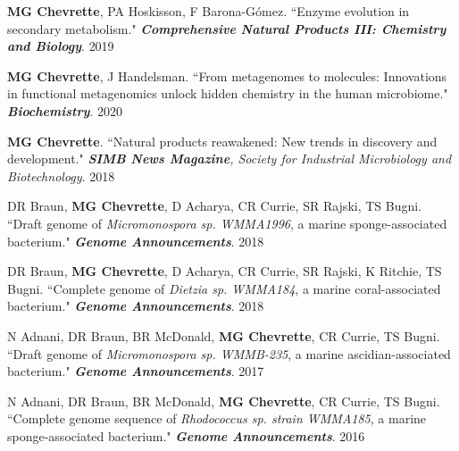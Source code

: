 
\begin{cvpubs}

\cvpub
{\textbf{MG Chevrette}, PA Hoskisson, F Barona-G\'{o}mez. ``Enzyme evolution in secondary metabolism." \textit{\textbf{Comprehensive Natural Products III: Chemistry and Biology}}. \textbf{\textit{}}}
{2019}

\end{cvpubs}


\begin{cvpubs}

\cvpub
{\textbf{MG Chevrette}, J Handelsman. ``From metagenomes to molecules: Innovations in functional metagenomics unlock hidden chemistry in the human microbiome." \textit{\textbf{Biochemistry}}. \textbf{\textit{}}}
{2020}

\cvpub
{\textbf{MG Chevrette}. ``Natural products reawakened: New trends in discovery and development." \textit{\textbf{SIMB News Magazine}, Society for Industrial Microbiology and Biotechnology}. }
{2018}

\end{cvpubs} \begin{cvpubs}

\cvpub
{DR Braun, \textbf{MG Chevrette}, D Acharya, CR Currie, SR Rajski, TS Bugni. ``Draft genome of \textit{Micromonospora sp. WMMA1996}, a marine sponge-associated bacterium." \textit{\textbf{Genome Announcements}}. \textbf{\textit{}}}
{2018}

\cvpub
{DR Braun, \textbf{MG Chevrette}, D Acharya, CR Currie, SR Rajski, K Ritchie, TS Bugni. ``Complete genome of \textit{Dietzia sp. WMMA184}, a marine coral-associated bacterium." \textit{\textbf{Genome Announcements}}. \textbf{\textit{}}}
{2018}

\cvpub
{N Adnani, DR Braun, BR McDonald, \textbf{MG Chevrette}, CR Currie, TS Bugni. ``Draft genome of \textit{Micromonospora sp. WMMB-235}, a marine ascidian-associated bacterium." \textit{\textbf{Genome Announcements}}. \textbf{\textit{}}}
{2017}

\cvpub
{N Adnani, DR Braun, BR McDonald, \textbf{MG Chevrette}, CR Currie, TS Bugni. ``Complete genome sequence of \textit{Rhodococcus sp. strain WMMA185}, a marine sponge-associated bacterium." \textit{\textbf{Genome Announcements}}. \textbf{\textit{}}}
{2016}

\end{cvpubs}

